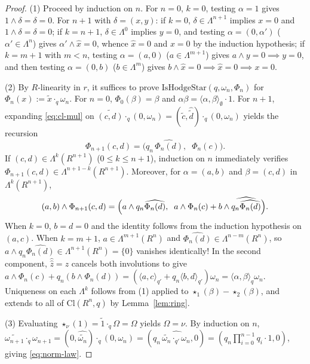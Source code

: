 \documentclass[11pt]{article}
\theoremstyle{definition}
\newcommand{\Cl}{\mathrm{Cl}}
\begin{document}
\begin{proof}
(1) Proceed by induction on $n$. For $n=0$, $k=0$, testing $\alpha = 1$ gives $1 \wedge \delta = \delta = 0$. For $n+1$ with $\delta = (x,y)$: if $k=0$, $\delta \in \Lambda^{n+1}$ implies $x=0$ and $1 \wedge \delta = \delta = 0$; if $k=n+1$, $\delta \in \Lambda^0$ implies $y=0$, and testing $\alpha = (0,\alpha')$ ($\alpha' \in \Lambda^n$) gives $\alpha' \wedge \hat{x} = 0$, whence $\hat{x}=0$ and $x=0$ by the induction hypothesis; if $k = m+1$ with $m < n$, testing $\alpha = (a,0)$ ($a \in \Lambda^{m+1}$) gives $a \wedge y = 0 \implies y = 0$, and then testing $\alpha = (0,b)$ ($b \in \Lambda^m$) gives $b \wedge \hat{x} = 0 \implies \hat{x} = 0 \implies x = 0$.

(2) By $R$-linearity in $r$, it suffices to prove $\mathrm{IsHodgeStar}(q, \omega_n, \Phi_n)$ for $\Phi_n(x) := \widetilde{x}\cdot_q \omega_n$. For $n=0$, $\Phi_0(\beta) = \beta$ and $\alpha\beta = \langle\alpha,\beta\rangle_\emptyset\cdot 1$. For $n+1$, expanding \eqref{eq:cl-mul} on $\widetilde{(c,d)}\cdot_q (0, \omega_n) = (\widetilde{c}, \widehat{\widetilde{d}})\cdot_q (0, \omega_n)$ yields the recursion
\[
  \Phi_{n+1}(c, d) = \bigl(q_n\,\widehat{\Phi_n(d)},\;\; \Phi_n(c)\bigr).
\]
If $(c,d) \in \Lambda^k(R^{n+1})$ ($0 \le k \le n+1$), induction on $n$ immediately verifies $\Phi_{n+1}(c,d) \in \Lambda^{n+1-k}(R^{n+1})$. Moreover, for $\alpha = (a,b)$ and $\beta = (c,d)$ in $\Lambda^k(R^{n+1})$,
\[
  (a,b) \wedge \Phi_{n+1}(c,d) = \Bigl(a \wedge q_n\widehat{\Phi_n(d)},\;\; a \wedge \Phi_n(c) + b \wedge \widehat{q_n\widehat{\Phi_n(d)}}\Bigr).
\]
When $k = 0$, $b = d = 0$ and the identity follows from the induction hypothesis on $(a,c)$. When $k = m+1$, $a \in \Lambda^{m+1}(R^n)$ and $\widehat{\Phi_n(d)} \in \Lambda^{n-m}(R^n)$, so $a \wedge q_n\widehat{\Phi_n(d)} \in \Lambda^{n+1}(R^n) = \{0\}$ vanishes identically! In the second component, $\hat{\hat{z}} = z$ cancels both involutions to give $a \wedge \Phi_n(c) + q_n(b \wedge \Phi_n(d)) = (\langle a,c\rangle_{q'} + q_n\langle b,d\rangle_{q'})\omega_n = \langle\alpha,\beta\rangle_q\omega_n$. Uniqueness on each $\Lambda^k$ follows from (1) applied to $\star_1(\beta) - \star_2(\beta)$, and extends to all of $\Cl(R^n,q)$ by Lemma~\ref{lem:ring}.

(3) Evaluating $\star_\nu(1) = \widetilde{1}\cdot_q\Omega = \Omega$ yields $\Omega = \nu$. By induction on $n$, $\widetilde{\omega_{n+1}}\cdot_q\omega_{n+1} = (0, \widehat{\widetilde{\omega_n}})\cdot_q(0, \omega_n) = (q_n\,\widehat{\widetilde{\omega_n}\cdot_{q'}\omega_n}, 0) = (q_n\prod_{i=0}^{n-1} q_i\cdot 1, 0)$, giving \eqref{eq:norm-law}.
\end{proof}
\end{document}
